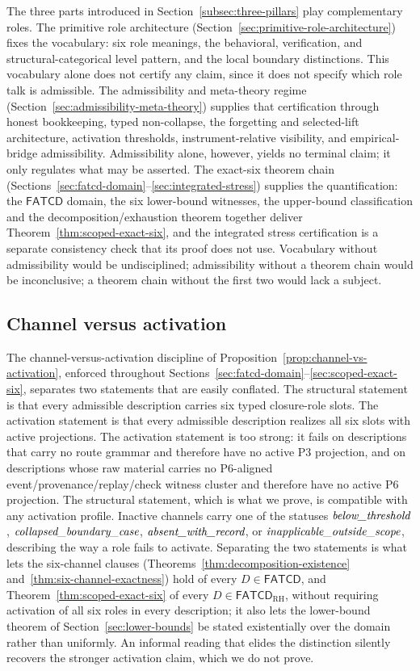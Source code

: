 \documentclass[11pt]{article}
\theoremstyle{definition}
\newcommand{\FATCD}{\ensuremath{\mathsf{FATCD}}}
\newcommand{\belowthr}{\textit{below\_\allowbreak threshold}}
\newcommand{\collapsedbc}{\textit{collapsed\_\allowbreak boundary\_\allowbreak case}}
\newcommand{\absentrec}{\textit{absent\_\allowbreak with\_\allowbreak record}}
\newcommand{\outsidescope}{\textit{inapplicable\_\allowbreak outside\_\allowbreak scope}}
\newcommand{\Pthree}{\ensuremath{\mathrm{P3}}}
\newcommand{\Psix}{\ensuremath{\mathrm{P6}}}
\begin{document}
The three parts introduced in Section~\ref{subsec:three-pillars} play
complementary roles. The primitive role architecture
(Section~\ref{sec:primitive-role-architecture}) fixes the vocabulary:
six role meanings, the behavioral, verification, and
structural-categorical level pattern, and the local boundary
distinctions. This vocabulary alone does not certify any claim,
since it does not specify which role talk is admissible. The
admissibility and meta-theory regime
(Section~\ref{sec:admissibility-meta-theory}) supplies that
certification through honest bookkeeping, typed non-collapse, the
forgetting and selected-lift architecture, activation thresholds,
instrument-relative visibility, and empirical-bridge admissibility.
Admissibility alone, however, yields no terminal claim; it only
regulates what may be asserted. The exact-six theorem chain
(Sections~\ref{sec:fatcd-domain}--\ref{sec:integrated-stress})
supplies the quantification: the \FATCD{} domain, the six
lower-bound witnesses, the upper-bound classification and the
decomposition/exhaustion theorem together deliver
Theorem~\ref{thm:scoped-exact-six}, and the integrated stress certification
is a separate consistency check that its proof does not use.
Vocabulary without admissibility would be undisciplined; admissibility
without a theorem chain would be inconclusive; a theorem chain without
the first two would lack a subject.

\subsection{Channel versus activation}\label{subsec:discussion-channel-vs-activation}

The channel-versus-activation discipline of
Proposition~\ref{prop:channel-vs-activation}, enforced throughout
Sections~\ref{sec:fatcd-domain}--\ref{sec:scoped-exact-six},
separates two statements that are easily conflated. The structural
statement is that every admissible description carries six typed
closure-role slots. The activation statement is that every admissible
description realizes all six slots with active projections. The
activation statement is too strong: it fails on descriptions that
carry no route grammar and therefore have no active \Pthree{}
projection, and on descriptions whose raw material carries no
\Psix{}-aligned event/provenance/replay/check witness cluster and
therefore have no active \Psix{} projection. The structural
statement, which is what we prove, is compatible with any activation
profile. Inactive channels carry one of the statuses
\(\belowthr{}\), \(\collapsedbc{}\), \(\absentrec{}\), or
\(\outsidescope{}\), describing the way a role fails to activate.
Separating the two statements is what lets the six-channel clauses
(Theorems~\ref{thm:decomposition-existence}
and~\ref{thm:six-channel-exactness}) hold of every \(D \in \FATCD{}\), and
Theorem~\ref{thm:scoped-exact-six} of every \(D\in\FATCD_{\mathrm{RH}}\),
without requiring activation of all six roles in every description; it also lets the lower-bound theorem of
Section~\ref{sec:lower-bounds} be stated existentially over the
domain rather than uniformly. An informal reading that elides the
distinction silently recovers the stronger activation claim, which we
do not prove.
\end{document}
